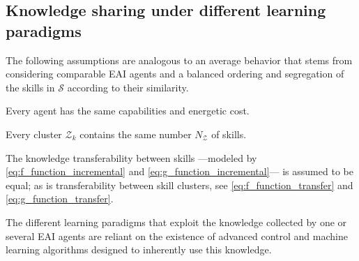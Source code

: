 \subsection{Knowledge sharing under different learning paradigms}
The following assumptions are analogous to an average behavior that stems from considering comparable EAI agents and a balanced ordering and segregation of the skills in $\mathcal{S}$ according to their similarity.
\begin{tcolorbox}
	\begin{assumption}\label{assumption:agent_similarity}
		Every agent has the same capabilities and energetic cost.
	\end{assumption}
\end{tcolorbox}
\begin{tcolorbox}
	\begin{assumption}\label{assumption:cluster_size}
		Every cluster $\mathcal{Z}_{k}$ contains the same number $N_{\mathcal{Z}} $ of skills.
	\end{assumption}
\end{tcolorbox}
\begin{tcolorbox}
	\begin{assumption}\label{assumption:cluster_transferability}
		The knowledge transferability between skills ---modeled by \eqref{eq:f_function_incremental} and \eqref{eq:g_function_incremental}--- is assumed to be equal; as is transferability between skill clusters, see \eqref{eq:f_function_transfer} and \eqref{eq:g_function_transfer}.
	\end{assumption}
\end{tcolorbox}

\begin{tcolorbox}
	\begin{assumption}\label{assumption:enabling_agorithms}
		The different learning paradigms that exploit the knowledge collected by one or several EAI agents are reliant on the existence of advanced control and machine learning algorithms designed to inherently use this knowledge.
	\end{assumption}
\end{tcolorbox}

